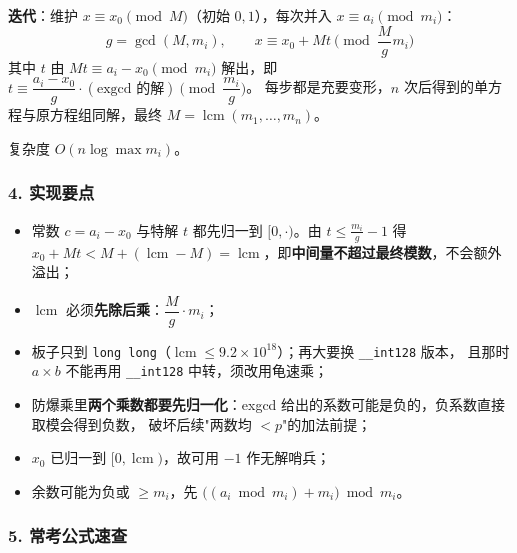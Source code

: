 \textbf{迭代}：维护 $x \equiv x_0 \pmod M$（初始 $0, 1$），每次并入 $x \equiv a_i \pmod{m_i}$：
$$g = \gcd(M, m_i), \qquad x \equiv x_0 + Mt \pmod{\frac{M}{g} m_i}$$
其中 $t$ 由 $M t \equiv a_i - x_0 \pmod{m_i}$ 解出，即 $t \equiv \dfrac{a_i - x_0}{g} \cdot (\text{exgcd 的解}) \pmod{\dfrac{m_i}{g}}$。
每步都是充要变形，$n$ 次后得到的单方程与原方程组同解，最终 $M = \operatorname{lcm}(m_1, \dots, m_n)$。

复杂度 $O(n \log \max m_i)$。

\hrulefill

\subsubsection*{4. 实现要点}

\begin{itemize}
    \item 常数 $c = a_i - x_0$ 与特解 $t$ 都先归一到 $[0, \cdot)$。由 $t \le \frac{m_i}{g} - 1$ 得
    $x_0 + Mt < M + (\operatorname{lcm} - M) = \operatorname{lcm}$，即\textbf{中间量不超过最终模数}，不会额外溢出；
    \item $\operatorname{lcm}$ 必须\textbf{先除后乘}：$\dfrac{M}{g} \cdot m_i$；
    \item 板子只到 \texttt{long long}（$\operatorname{lcm} \le 9.2 \times 10^{18}$）；再大要换 \texttt{\_\_int128} 版本，
    且那时 $a \times b$ 不能再用 \texttt{\_\_int128} 中转，须改用龟速乘；
    \item 防爆乘里\textbf{两个乘数都要先归一化}：exgcd 给出的系数可能是负的，负系数直接取模会得到负数，
    破坏后续"两数均 $< p$"的加法前提；
    \item $x_0$ 已归一到 $[0, \operatorname{lcm})$，故可用 $-1$ 作无解哨兵；
    \item 余数可能为负或 $\ge m_i$，先 $\big((a_i \bmod m_i) + m_i\big) \bmod m_i$。
\end{itemize}

\hrulefill

\subsubsection*{5. 常考公式速查}

